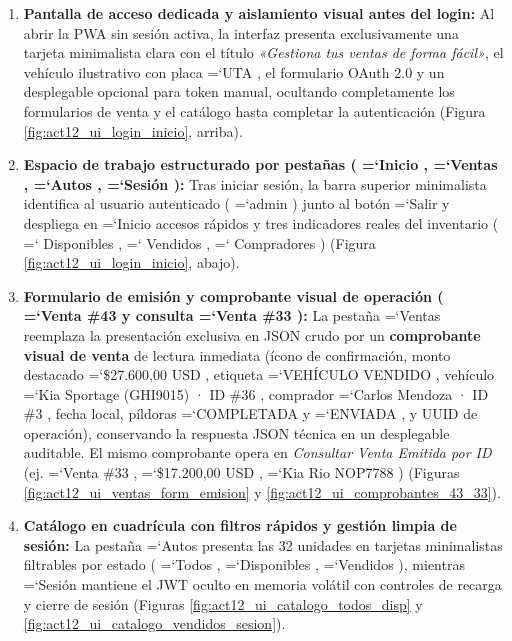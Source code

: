 \documentclass[11pt,a4paper]{article}
\renewcommand{\_}{\oldunderscore\allowbreak}
\DeclareRobustCommand{\texttt}[1]{%
  {\upshape\ttfamily\fontsize{9}{10.8}\selectfont\hyphenchar\font=`\-\relax #1}%
}
\begin{document}
\begin{enumerate}[leftmargin=*,itemsep=2pt,topsep=1pt]
  \item \textbf{Pantalla de acceso dedicada y aislamiento visual antes del login:} Al abrir la PWA sin sesión activa, la interfaz presenta exclusivamente una tarjeta minimalista clara con el título \textit{«Gestiona tus ventas de forma fácil»}, el vehículo ilustrativo con placa \texttt{UTA}, el formulario OAuth 2.0 y un desplegable opcional para token manual, ocultando completamente los formularios de venta y el catálogo hasta completar la autenticación (Figura \ref{fig:act12_ui_login_inicio}, arriba).
  \item \textbf{Espacio de trabajo estructurado por pestañas (\texttt{Inicio}, \texttt{Ventas}, \texttt{Autos}, \texttt{Sesión}):} Tras iniciar sesión, la barra superior minimalista identifica al usuario autenticado (\texttt{admin}) junto al botón \texttt{Salir} y despliega en \texttt{Inicio} accesos rápidos y tres indicadores reales del inventario (\texttt{10 Disponibles}, \texttt{21 Vendidos}, \texttt{6 Compradores}) (Figura \ref{fig:act12_ui_login_inicio}, abajo).
  \item \textbf{Formulario de emisión y comprobante visual de operación (\texttt{Venta \#43} y consulta \texttt{Venta \#33}):} La pestaña \texttt{Ventas} reemplaza la presentación exclusiva en JSON crudo por un \textbf{comprobante visual de venta} de lectura inmediata (ícono de confirmación, monto destacado \texttt{\$27.\allowbreak{}600,\allowbreak{}00 USD}, etiqueta \texttt{VEHÍCULO VENDIDO}, vehículo \texttt{Kia Sportage (GHI9015) · ID \#36}, comprador \texttt{Carlos Mendoza · ID \#3}, fecha local, píldoras \texttt{COMPLETADA} y \texttt{ENVIADA}, y UUID de operación), conservando la respuesta JSON técnica en un desplegable auditable. El mismo comprobante opera en \textit{Consultar Venta Emitida por ID} (ej. \texttt{Venta \#33}, \texttt{\$17.\allowbreak{}200,\allowbreak{}00 USD}, \texttt{Kia Rio NOP7788}) (Figuras \ref{fig:act12_ui_ventas_form_emision} y \ref{fig:act12_ui_comprobantes_43_33}).
  \item \textbf{Catálogo en cuadrícula con filtros rápidos y gestión limpia de sesión:} La pestaña \texttt{Autos} presenta las 32 unidades en tarjetas minimalistas filtrables por estado (\texttt{Todos}, \texttt{Disponibles}, \texttt{Vendidos}), mientras \texttt{Sesión} mantiene el JWT oculto en memoria volátil con controles de recarga y cierre de sesión (Figuras \ref{fig:act12_ui_catalogo_todos_disp} y \ref{fig:act12_ui_catalogo_vendidos_sesion}).
\end{enumerate}
\end{document}
